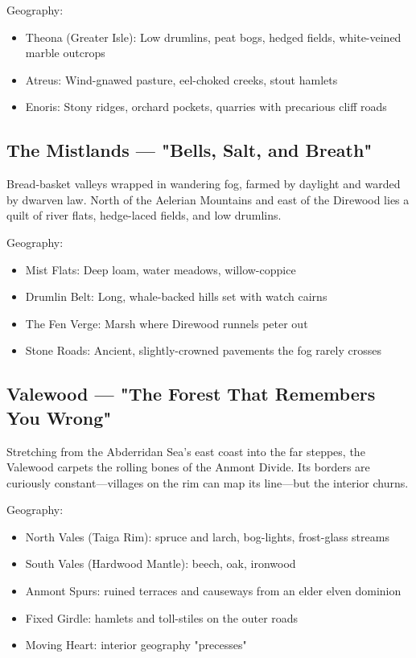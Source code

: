 Geography:
\begin{itemize}
    \item Theona (Greater Isle): Low drumlins, peat bogs, hedged fields, white-veined marble outcrops
    \item Atreus: Wind-gnawed pasture, eel-choked creeks, stout hamlets
    \item Enoris: Stony ridges, orchard pockets, quarries with precarious cliff roads
\end{itemize}

\subsection{The Mistlands — "Bells, Salt, and Breath"}
\label{sec:mistlands}

Bread-basket valleys wrapped in wandering fog, farmed by daylight and warded by dwarven law. North of the Aelerian Mountains and east of the Direwood lies a quilt of river flats, hedge-laced fields, and low drumlins.

Geography:
\begin{itemize}
    \item Mist Flats: Deep loam, water meadows, willow-coppice
    \item Drumlin Belt: Long, whale-backed hills set with watch cairns
    \item The Fen Verge: Marsh where Direwood runnels peter out
    \item Stone Roads: Ancient, slightly-crowned pavements the fog rarely crosses
\end{itemize}

\subsection{Valewood — "The Forest That Remembers You Wrong"}
\label{sec:valewood}

Stretching from the Abderridan Sea's east coast into the far steppes, the Valewood carpets the rolling bones of the Anmont Divide. Its borders are curiously constant—villages on the rim can map its line—but the interior churns.

Geography:
\begin{itemize}
    \item North Vales (Taiga Rim): spruce and larch, bog-lights, frost-glass streams
    \item South Vales (Hardwood Mantle): beech, oak, ironwood
    \item Anmont Spurs: ruined terraces and causeways from an elder elven dominion
    \item Fixed Girdle: hamlets and toll-stiles on the outer roads
    \item Moving Heart: interior geography "precesses"
\end{itemize}

